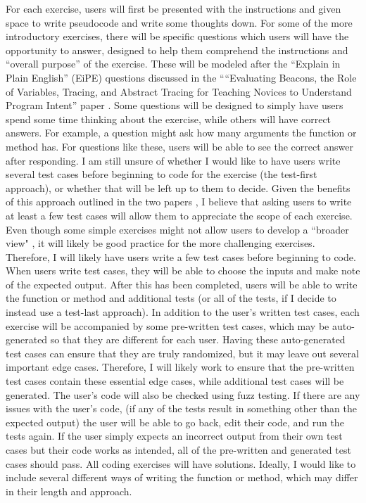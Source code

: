 \documentclass[10pt,twocolumn]{article}
\begin{document}
For each exercise, users will first be presented with the instructions and given space to write pseudocode and write some thoughts down. For some of the more introductory exercises, there will be specific questions which users will have the opportunity to answer, designed to help them comprehend the instructions and “overall purpose” of the exercise. These will be modeled after the “Explain in Plain English” (EiPE) questions discussed in the ““Evaluating Beacons, the Role of Variables, Tracing, and Abstract Tracing for Teaching Novices to Understand Program Intent” paper \cite{Teaching}. Some questions will be designed to simply have users spend some time thinking about the exercise, while others will have correct answers. For example, a question might ask how many arguments the function or method has. For questions like these, users will be able to see the correct answer after responding. I am still unsure of whether I would like to have users write several test cases before beginning to code for the exercise (the test-first approach), or whether that will be left up to them to decide. Given the benefits of this approach outlined in the two papers \cite{Test-driven} \cite{Test-first}, I believe that asking users to write at least a few test cases will allow them to appreciate the scope of each exercise. Even though some simple exercises might not allow users to develop a “broader view" \cite{Test-first}, it will likely be good practice for the more challenging exercises. Therefore, I will likely have users write a few test cases before beginning to code. When users write test cases, they will be able to choose the inputs and make note of the expected output. After this has been completed, users will be able to write the function or method and additional tests (or all of the tests, if I decide to instead use a test-last approach). In addition to the user’s written test cases, each exercise will be accompanied by some pre-written test cases, which may be auto-generated so that they are different for each user. Having these auto-generated test cases can ensure that they are truly randomized, but it may leave out several important edge cases. Therefore, I will likely work to ensure that the pre-written test cases contain these essential edge cases, while additional test cases will be generated. The user’s code will also be checked using fuzz testing. If there are any issues with the user’s code, (if any of the tests result in something other than the expected output) the user will be able to go back, edit their code, and run the tests again. If the user simply expects an incorrect output from their own test cases but their code works as intended, all of the pre-written and generated test cases should pass. All coding exercises will have solutions. Ideally, I would like to include several different ways of writing the function or method, which may differ in their length and approach.
\end{document}
